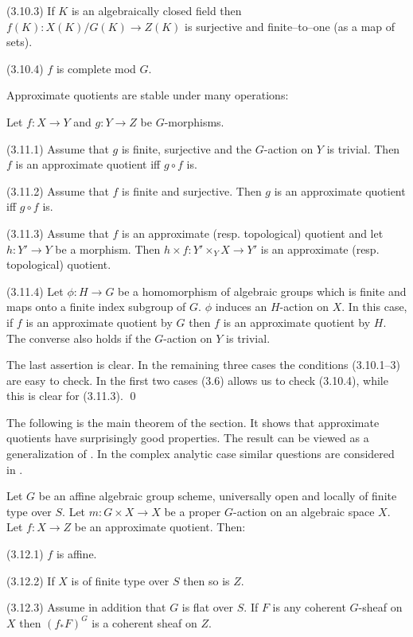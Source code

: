 (3.10.3) If $K$ is  an algebraically closed field then
$f(K):X(K)/G(K)\to Z(K)$ is surjective and finite--to--one (as a map of
sets).

(3.10.4) $f$ is complete mod $G$.
\enddemo


Approximate quotients are stable under many operations:

 Let $f:X\to Y$ and $g:Y\to Z$ be $G$-morphisms.

(3.11.1) Assume that $g$ is finite, surjective and the $G$-action on $Y$ is
trivial. Then $f$ is an approximate quotient iff $g\circ f$ is.

(3.11.2) Assume that $f$ is finite and surjective. Then $g$ is an approximate
quotient iff $g\circ f$ is.

(3.11.3)  Assume that  $f$ is an approximate (resp. topological) quotient and
let
$h:Y'\to Y$ be a morphism. Then $h\times f:Y'\times_YX\to Y'$ is an approximate
 (resp. topological) quotient.

(3.11.4) Let $\phi:H\to G$ be a homomorphism of algebraic groups which is
finite and maps onto a finite index subgroup of $G$. $\phi$ induces an
$H$-action on $X$. In this case, if $f$ is an approximate quotient by $G$ then
$f$ is an approximate quotient by $H$. The converse also holds if the
$G$-action on $Y$ is trivial.
\endproclaim

\demop The last assertion is clear.
In the remaining three cases the conditions (3.10.1--3) are easy to check.
In the first two cases (3.6) allows us to check (3.10.4), while this is
clear for (3.11.3). \qed\enddemo



The following is the main theorem of the section. It shows that approximate
quotients have surprisingly good properties.
The result can be viewed as a generalization of \cite{Fogarty83}.
In the complex analytic case similar questions are considered in
\cite{Roberts86}.


 Let $G$ be an affine algebraic group scheme,
universally open and locally of finite type over $S$. Let $m:G\times X\to X$
be a proper $G$-action on an algebraic space $X$.
 Let  $f:X\to Z$ be an approximate quotient.
 Then:

(3.12.1) $f$ is affine.

(3.12.2) If $X$ is of finite type over $S$ then so is $Z$.

(3.12.3)  Assume in addition that $G$ is flat over $S$. If $F$ is any coherent
$G$-sheaf on
$X$ then
$(f_*F)^G$ is a coherent sheaf on $Z$.
\endproclaim



